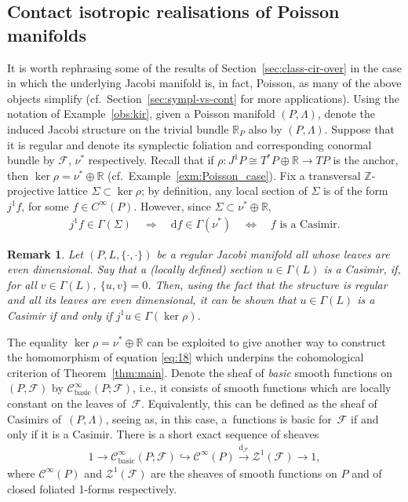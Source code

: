 \documentclass[10pt,a4paper]{amsart}
\numberwithin{equation}{section}
\newtheorem{Remark}[Theorem]{Remark} }
\newcommand{\de}{\mathrm{d}} %
\newcommand{\JM}{(P,L,\{\cdot,\cdot\})} %
\newcommand{\PM}{(P,\Lambda)} %
\newcommand{\RR}{\mathbb{R}}
\newcommand{\ZZ}{\mathbb{Z}}
\begin{document}
\subsection{Contact isotropic realisations of Poisson manifolds}\label{sec:cont-isotr-real-1}
It is worth rephrasing some of the results of Section~\ref{sec:class-cir-over} in the case in which the underlying Jacobi manifold is, in fact, Poisson, as many of the above objects simplify (cf.\ Section~\ref{sec:sympl-vs-cont} for more applications). Using the notation of Example~\ref{obs:kir}, given a Poisson manifold $\PM$, denote the induced Jacobi structure on the trivial bundle $\RR_P$ also by $\PM$. Suppose that it is regular and denote its symplectic foliation and corresponding conormal bundle by $\mathcal{F}$, $\nu^*$ respectively. Recall that if $\rho \colon J^1P \cong T^*P \oplus \RR \to TP$ is the anchor, then $\ker \rho = \nu^* \oplus \RR$ (cf.\ Example~\ref{exm:Poisson_case}). Fix a transversal $\ZZ$-projective lattice $\Sigma \subset \ker \rho$; by def\/inition, any local section of $\Sigma$ is of the form $j^1 f$, for some $f \in C^{\infty}(P)$. However, since $\Sigma \subset \nu^* \oplus \RR$,
\begin{gather} \label{eq:21}
 j^1 f \in \Gamma(\Sigma) \quad \Rightarrow \quad \de f \in \Gamma(\nu^*) \quad \Leftrightarrow \quad f \text{ is a Casimir}.
\end{gather}

\begin{Remark}\label{rk:general_ker_Casimir}
Let $\JM$ be a regular Jacobi manifold all whose leaves are even di\-men\-sio\-nal. Say that a (locally def\/ined) section $u \in \Gamma(L)$ is a {\it Casimir}, if, for all $v \in \Gamma(L)$, $\{u,v\}=0$. Then, using the fact that the structure is regular and all its leaves are even di\-men\-sio\-nal, it can be shown that $u \in \Gamma(L)$ is a Casimir if and only if $j^1u \in \Gamma(\ker \rho)$.
\end{Remark}

The equality $\ker \rho = \nu^* \oplus \RR$ can be exploited to give another way to construct the homomorphism of equation \eqref{eq:18} which underpins the cohomological criterion of Theorem~\ref{thm:main}. Denote the sheaf of {\it basic} smooth functions on~$(P,\mathcal{F})$ by $\mathcal{C}^{\infty}_{\mathrm{basic}}(P;\mathcal{F})$, i.e., it consists of smooth functions which are locally constant on the leaves of~$\mathcal{F}$. Equivalently, this can be def\/ined as the sheaf of Casimirs of~$\PM$, seeing as, in this case, a~functions is basic for~$\mathcal{F}$ if and only if it is a Casimir. There is a short exact sequence of sheaves
\begin{gather*}
 1 \to\mathcal{C}^{\infty}_{\mathrm{basic}}(P;\mathcal{F}) \hookrightarrow\mathcal{C}^{\infty} (P) \xrightarrow{\de_{\mathcal{F}}}\mathcal{Z}^1(\mathcal{F}) \to 1,
\end{gather*}
where $\mathcal{C}^{\infty} (P)$ and $\mathcal{Z}^1(\mathcal{F})$ are the sheaves of smooth functions on $P$ and of closed foliated 1-forms respectively.
\end{document}
